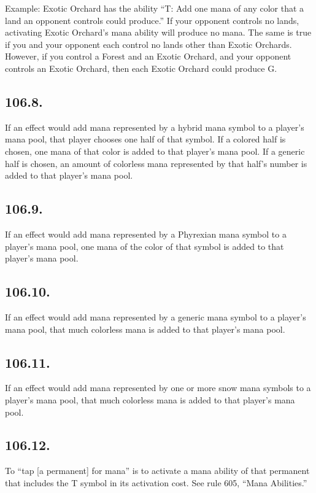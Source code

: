 Example: Exotic Orchard has the ability “{T}: Add one mana of any color that a land an opponent controls could produce.” If your opponent controls no lands, activating Exotic Orchard’s mana ability will produce no mana. The same is true if you and your opponent each control no lands other than Exotic Orchards. However, if you control a Forest and an Exotic Orchard, and your opponent controls an Exotic Orchard, then each Exotic Orchard could produce {G}.

\subsection*{106.8.}
If an effect would add mana represented by a hybrid mana symbol to a player’s mana pool, that player chooses one half of that symbol. If a colored half is chosen, one mana of that color is added to that player’s mana pool. If a generic half is chosen, an amount of colorless mana represented by that half’s number is added to that player’s mana pool.

\subsection*{106.9.}
If an effect would add mana represented by a Phyrexian mana symbol to a player’s mana pool, one mana of the color of that symbol is added to that player’s mana pool.

\subsection*{106.10.}
If an effect would add mana represented by a generic mana symbol to a player’s mana pool, that much colorless mana is added to that player’s mana pool.

\subsection*{106.11.}
If an effect would add mana represented by one or more snow mana symbols to a player’s mana pool, that much colorless mana is added to that player’s mana pool.

\subsection*{106.12.}
To “tap [a permanent] for mana” is to activate a mana ability of that permanent that includes the {T} symbol in its activation cost. See rule 605, “Mana Abilities.”

